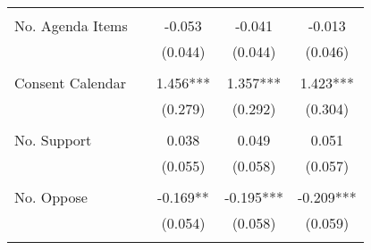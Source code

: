\begin{tabular}{lcccc}
                  &                                   &                                   &                                   &                                   \\
 No. Agenda Items &                                   &                            -0.053 &                            -0.041 &                            -0.013 \\
                  &                                   &                           (0.044) &                           (0.044) &                           (0.046) \\
                  &                                   &                                   &                                   &                                   \\
 Consent Calendar &                                   &                          1.456*** &                          1.357*** &                          1.423*** \\
                  &                                   &                           (0.279) &                           (0.292) &                           (0.304) \\
                  &                                   &                                   &                                   &                                   \\
      No. Support &                                   &                             0.038 &                             0.049 &                             0.051 \\
                  &                                   &                           (0.055) &                           (0.058) &                           (0.057) \\
                  &                                   &                                   &                                   &                                   \\
       No. Oppose &                                   &                          -0.169** &                         -0.195*** &                         -0.209*** \\
                  &                                   &                           (0.054) &                           (0.058) &                           (0.059) \\
                  &                                   &                                   &                                   &                                   \\

\end{tabular}
